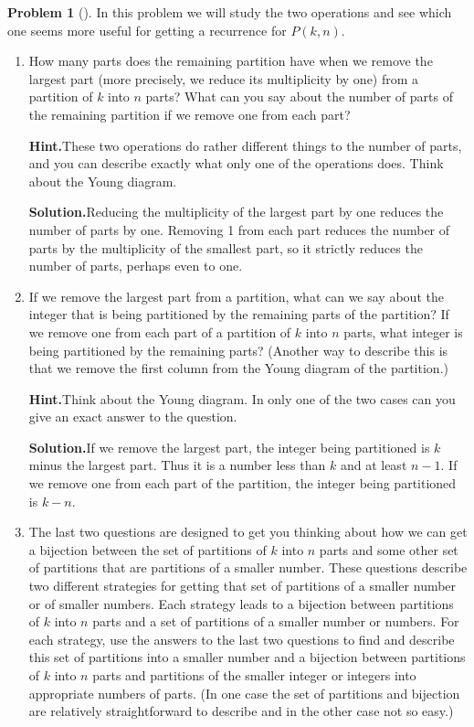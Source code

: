 \documentclass[10pt,]{book}
\theoremstyle{plain}
\theoremstyle{definition}
\newtheorem{activity}[project]{Problem}
\theoremstyle{definition}
\numberwithin{equation}{chapter}
\begin{document}
\begin{activity}[]\label{numberpartitionrecurrence}
In this problem we will study the two operations and see which one seems more useful for getting a recurrence for \(P(k,n)\).%
\begin{enumerate}[font=\bfseries,label=(\alph*),ref=\alph*]
\item\label{task-119} How many parts does the remaining partition have when we remove the largest part (more precisely, we reduce its multiplicity by one) from a partition of \(k\) into \(n\) parts?  What can you say about the number of parts of the remaining partition if we remove one from each part?%
\par\medskip\noindent%
\textbf{Hint.}\quad These two operations do rather different things to the number of parts, and you can describe exactly what only one of the operations does. Think about the Young diagram.%
\par\medskip\noindent%
\textbf{Solution.}\quad Reducing the multiplicity of the largest part by one reduces the number of parts by one. Removing 1 from each part reduces the number of parts by the multiplicity of the smallest part, so it strictly reduces the number of parts, perhaps even to one.%
\item\label{task-120} If we remove the largest part from a partition, what can we say about the integer that is being partitioned by the remaining parts of the partition? If we remove one from each part of a partition of \(k\) into \(n\) parts, what integer is being partitioned by the remaining parts? (Another way to describe this is that we remove the first column from the Young diagram of the partition.)%
\par\medskip\noindent%
\textbf{Hint.}\quad Think about the Young diagram. In only one of the two cases can you give an exact answer to the question.%
\par\medskip\noindent%
\textbf{Solution.}\quad If we remove the largest part, the integer being partitioned is \(k\) minus the largest part. Thus it is a number less than \(k\) and at least \(n-1\). If we remove one from each part of the partition, the integer being partitioned is \(k-n\).%
\item\label{task-121} The last two questions are designed to get you thinking about how we can get a bijection between the set of partitions of \(k\) into \(n\) parts and some other set of partitions that are partitions of a smaller number.  These questions describe two different strategies for getting that set of partitions of a smaller number or of smaller numbers.  Each strategy leads to a bijection between partitions of \(k\) into \(n\) parts and a set of partitions of a smaller number or numbers.  For each strategy, use the answers to the last two questions to find and describe this set of partitions into a smaller number and a bijection between partitions of \(k\) into \(n\) parts and partitions of the smaller integer or integers into appropriate numbers of parts. (In one case the set of partitions and bijection are relatively straightforward to describe and in the other case not so easy.)%

\end{enumerate}
\end{activity}
\end{document}
